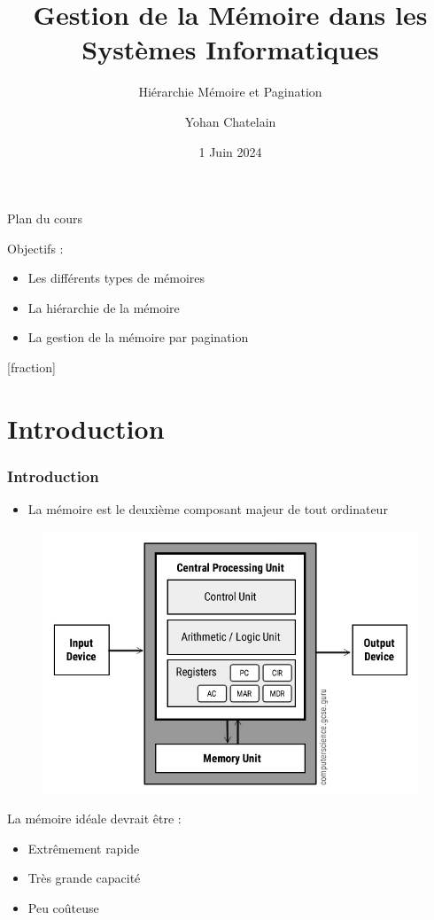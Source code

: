 \documentclass[8pt]{beamer}
\title{Gestion de la Mémoire dans les Systèmes Informatiques}
\subtitle{Hiérarchie Mémoire et Pagination}
\author{Yohan Chatelain}
\institute{Polytechnique Montr\'eal}
\date{1 Juin 2024}
\begin{document}
\begin{frame}
    \titlepage
\end{frame}

\begin{frame}{Plan du cours}
    \begin{block}{Objectifs : }

        \begin{itemize}
            \item Les différents types de mémoires
            \item La hiérarchie de la mémoire
            \item La gestion de la mémoire par pagination
        \end{itemize}
    \end{block}
\end{frame}

\addtocounter{framenumber}{-2}
[fraction]

\section*{Introduction}
\begin{frame}
    \frametitle{Introduction}
    \begin{itemize}
        \item La mémoire est le deuxième composant majeur de tout ordinateur
    \end{itemize}
    \begin{figure}
        \centering

        \includegraphics[width=.45\textwidth]{figures/Von-Neumann-Architecture-Diagram.jpg}
        \label{fig:sub1}
    \end{figure}
    \begin{block}{La mémoire idéale devrait être :}
        \begin{itemize}
            \item Extrêmement rapide
            \item Très grande capacité
            \item Peu coûteuse
        \end{itemize}
    \end{block}

\end{frame}
\end{document}
